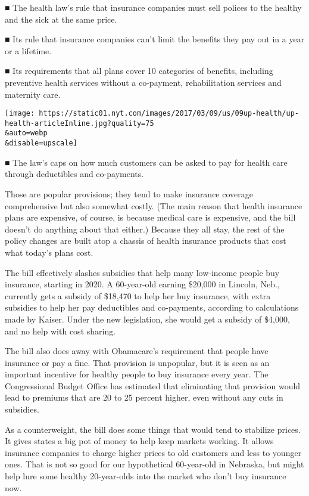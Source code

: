 ■ The health law's rule that insurance companies must sell polices to
the healthy and the sick at the same price.

■ Its rule that insurance companies can't limit the benefits they pay
out in a year or a lifetime.

■ Its requirements that all plans cover 10 categories of benefits,
including preventive health services without a co-payment,
rehabilitation services and maternity care.

\texttt{[image: https://static01.nyt.com/images/2017/03/09/us/09up-health/up-health-articleInline.jpg?quality=75\\\&auto=webp\\\&disable=upscale]}

■ The law's caps on how much customers can be asked to pay for health
care through deductibles and co-payments.

Those are popular provisions; they tend to make insurance coverage
comprehensive but also somewhat costly. (The main reason that health
insurance plans are expensive, of course, is because medical care is
expensive, and the bill doesn't do anything about that either.) Because
they all stay, the rest of the policy changes are built atop a chassis
of health insurance products that cost what today's plans cost.

The bill effectively slashes subsidies that help many low-income people
buy insurance, starting in 2020. A 60-year-old earning \$20,000 in
Lincoln, Neb., currently gets a subsidy of \$18,470 to help her buy
insurance, with extra subsidies to help her pay deductibles and
co-payments, according to calculations made by Kaiser. Under the new
legislation, she would get a subsidy of \$4,000, and no help with cost
sharing.

The bill also does away with Obamacare's requirement that people have
insurance or pay a fine. That provision is unpopular, but it is seen as
an important incentive for healthy people to buy insurance every year.
The Congressional Budget Office has estimated that eliminating that
provision would lead to premiums that are 20 to 25 percent higher, even
without any cuts in subsidies.

As a counterweight, the bill does some things that would tend to
stabilize prices. It gives states a big pot of money to help keep
markets working. It allows insurance companies to charge higher prices
to old customers and less to younger ones. That is not so good for our
hypothetical 60-year-old in Nebraska, but might help lure some healthy
20-year-olds into the market who don't buy insurance now.

